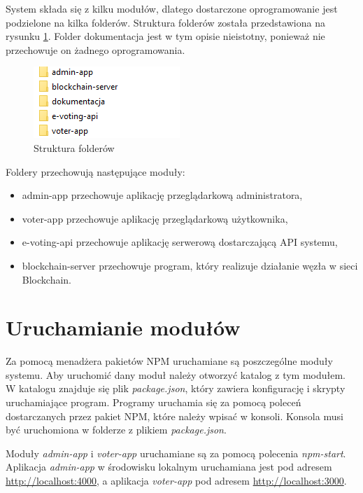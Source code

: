 \documentclass[a4paper,12pt]{book}
\begin{document}
System składa się z kilku modułów, dlatego dostarczone oprogramowanie jest podzielone na kilka folderów. Struktura folderów została przedstawiona na rysunku \ref{foldery}. Folder dokumentacja jest w tym opisie nieistotny, ponieważ nie przechowuje on żadnego oprogramowania.

\begin{figure}[h]
	\centering
	\includegraphics[width=\textwidth]{images/foldery.png}
	\caption{Struktura folderów}\label{foldery}
\end {figure}

Foldery przechowują następujące moduły:
\begin{itemize}
	\item admin-app przechowuje aplikację przeglądarkową administratora,
	\item voter-app przechowuje aplikację przeglądarkową użytkownika,
	\item e-voting-api przechowuje aplikację serwerową dostarczającą API systemu,
	\item blockchain-server przechowuje program, który realizuje działanie węzła w sieci Blockchain.
\end{itemize}

\section{Uruchamianie modułów}

Za pomocą menadżera pakietów NPM uruchamiane są poszczególne moduły systemu. Aby uruchomić dany moduł należy otworzyć katalog z tym modułem. W katalogu znajduje się plik \textit{package.json}, który zawiera konfigurację i skrypty uruchamiające program. Programy uruchamia się za pomocą poleceń dostarczanych przez pakiet NPM, które należy wpisać w konsoli. Konsola musi być uruchomiona w folderze z plikiem \textit{package.json}.

Moduły \textit{admin-app} i \textit{voter-app} uruchamiane są za pomocą polecenia \textit{npm-start}. Aplikacja \textit{admin-app} w środowisku lokalnym uruchamiana jest pod adresem \url{http://localhost:4000}, a aplikacja \textit{voter-app} pod adresem \url{http://localhost:3000}.
\end{document}
